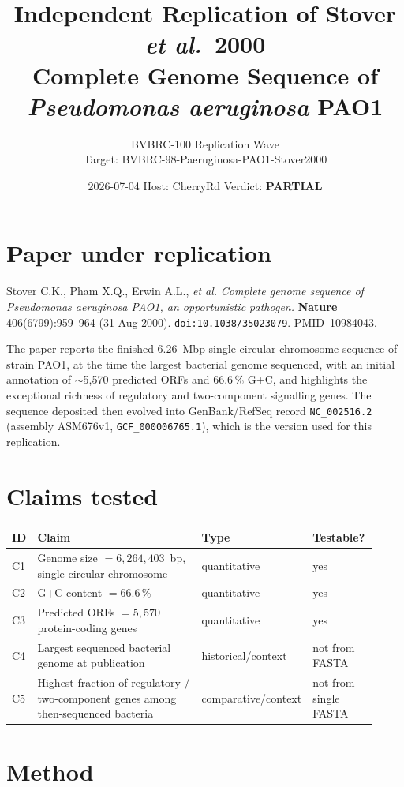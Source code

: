 \documentclass[11pt,letterpaper]{article}
\title{Independent Replication of Stover \emph{et al.}\ 2000 \\
       \large Complete Genome Sequence of \emph{Pseudomonas aeruginosa} PAO1}
\author{BVBRC-100 Replication Wave \\ Target: BVBRC-98-Paeruginosa-PAO1-Stover2000}
\date{2026-07-04 \quad Host: CherryRd \quad Verdict: \textbf{PARTIAL}}
\begin{document}
\maketitle

\section{Paper under replication}

Stover C.K., Pham X.Q., Erwin A.L., \emph{et al.}
\emph{Complete genome sequence of Pseudomonas aeruginosa PAO1, an
opportunistic pathogen.} \textbf{Nature} 406(6799):959--964
(31 Aug 2000). \texttt{doi:10.1038/35023079}. PMID~10984043.

The paper reports the finished 6.26~Mbp single-circular-chromosome
sequence of strain PAO1, at the time the largest bacterial genome
sequenced, with an initial annotation of $\sim$5{,}570 predicted ORFs and
66.6\,\% G+C, and highlights the exceptional richness of regulatory and
two-component signalling genes. The sequence deposited then evolved into
GenBank/RefSeq record \texttt{NC\_002516.2} (assembly ASM676v1,
\texttt{GCF\_000006765.1}), which is the version used for this
replication.

\section{Claims tested}

\begin{longtable}{@{}p{0.05\linewidth}p{0.55\linewidth}p{0.14\linewidth}p{0.18\linewidth}@{}}
\toprule
ID & Claim & Type & Testable? \\
\midrule
C1 & Genome size $= 6{,}264{,}403$~bp, single circular chromosome & quantitative & yes \\
C2 & G+C content $= 66.6$\,\% & quantitative & yes \\
C3 & Predicted ORFs $= 5{,}570$ protein-coding genes & quantitative & yes \\
C4 & Largest sequenced bacterial genome at publication & historical/context & not from FASTA \\
C5 & Highest fraction of regulatory / two-component genes among then-sequenced bacteria & comparative/context & not from single FASTA \\
\bottomrule
\end{longtable}

\section{Method}
\end{document}
